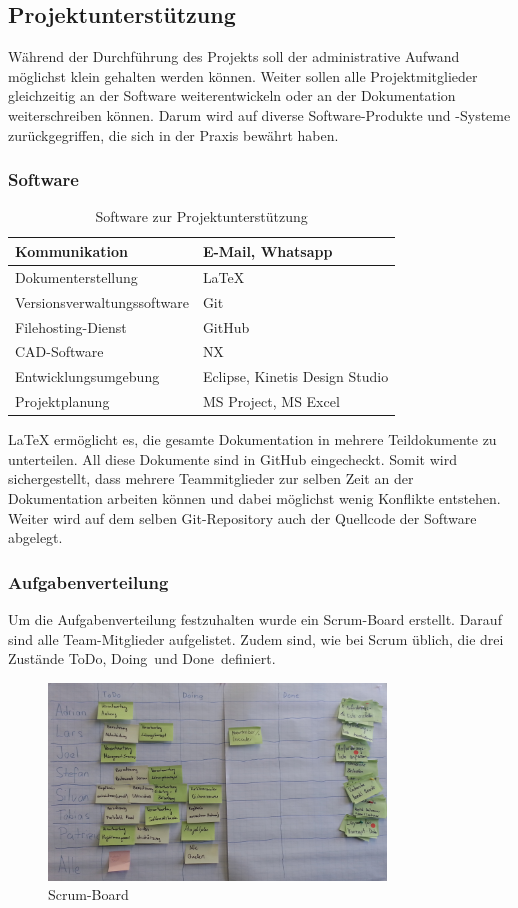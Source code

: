 \subsection{Projektunterstützung}
Während der Durchführung des Projekts soll der administrative Aufwand möglichst klein gehalten werden können. Weiter sollen alle Projektmitglieder gleichzeitig an der Software weiterentwickeln oder an der Dokumentation weiterschreiben können. Darum wird auf diverse Software-Produkte und -Systeme zurückgegriffen, die sich in der Praxis bewährt haben.
%
\subsubsection{Software}
\begin{table}[H]
\begin{tabular}{|p{}|p{}|}\hline
%	
Kommunikation	&	E-Mail, Whatsapp \\\hline
Dokumenterstellung & LaTeX\\\hline
Versionsverwaltungssoftware & Git \\\hline
Filehosting-Dienst & GitHub \\\hline
CAD-Software & NX\\\hline
Entwicklungsumgebung	& Eclipse, Kinetis Design Studio \\\hline
Projektplanung & MS Project, MS Excel \\\hline
\end{tabular}
\caption{Software zur Projektunterstützung}
\end{table}
LaTeX ermöglicht es, die gesamte Dokumentation in mehrere Teildokumente zu unterteilen. All diese Dokumente sind in GitHub eingecheckt. Somit wird sichergestellt, dass mehrere Teammitglieder zur selben Zeit an der Dokumentation arbeiten können und dabei möglichst wenig Konflikte entstehen. Weiter wird auf dem selben Git-Repository auch der Quellcode der Software abgelegt. \\
\subsubsection{Aufgabenverteilung}
Um die Aufgabenverteilung festzuhalten wurde ein Scrum-Board erstellt. Darauf sind alle Team-Mitglieder aufgelistet. Zudem sind, wie bei Scrum üblich, die drei Zustände \glqq ToDo\grqq, \glqq Doing\grqq \ und \glqq Done\grqq \ definiert.
\begin{figure}[H]%
\centering
\includegraphics[width=0.8\textwidth]{04_Projektmanagement/fig/scrumBoard.jpg}
\caption{Scrum-Board}
\label{fig:scrumBoard}
\end{figure}